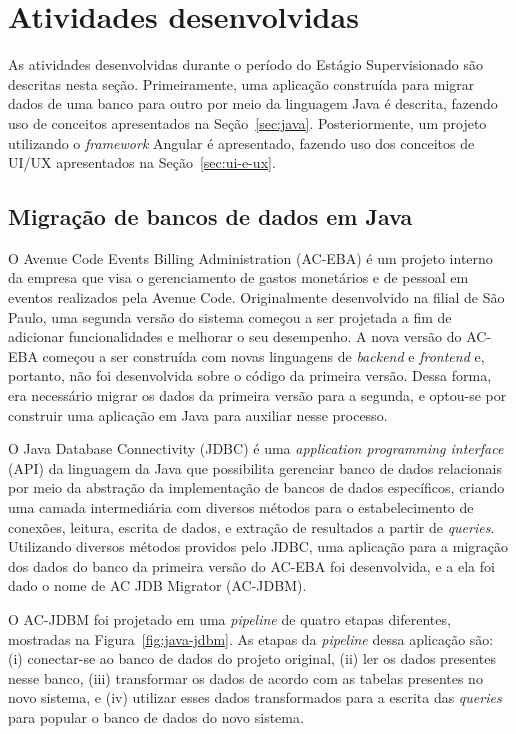 \chapter{Atividades desenvolvidas}
\label{cap:atividades-desenvolvidas}

As atividades desenvolvidas durante o período do Estágio Supervisionado são descritas nesta seção. Primeiramente, uma aplicação construída para migrar dados de uma banco para outro por meio da linguagem Java é descrita, fazendo uso de conceitos apresentados na Seção~\ref{sec:java}. Posteriormente, um projeto utilizando o \textit{framework} Angular é apresentado, fazendo uso dos conceitos de UI/UX apresentados na Seção~\ref{sec:ui-e-ux}.

\section{Migração de bancos de dados em Java}
\label{sec:java-atividades}

O Avenue Code Events Billing Administration (AC-EBA) é um projeto interno da empresa que visa o gerenciamento de gastos monetários e de pessoal em eventos realizados pela Avenue Code. Originalmente desenvolvido na filial de São Paulo, uma segunda versão do sistema começou a ser projetada a fim de adicionar funcionalidades e melhorar o seu desempenho. A nova versão do AC-EBA começou a ser construída com novas linguagens de \textit{backend} e \textit{frontend} e, portanto, não foi desenvolvida sobre o código da primeira versão. Dessa forma, era necessário migrar os dados da primeira versão para a segunda, e optou-se por construir uma aplicação em Java para auxiliar nesse processo.

O Java Database Connectivity (JDBC) é uma \textit{application programming interface} (API) da linguagem da Java que possibilita gerenciar banco de dados relacionais por meio da abstração da implementação de bancos de dados específicos, criando uma camada intermediária com diversos métodos para o estabelecimento de conexões, leitura, escrita de dados, e extração de resultados a partir de \textit{queries}. Utilizando diversos métodos providos pelo JDBC, uma aplicação para a migração dos dados do banco da primeira versão do AC-EBA foi desenvolvida, e a ela foi dado o nome de AC JDB Migrator (AC-JDBM).

O AC-JDBM foi projetado em uma \textit{pipeline} de quatro etapas diferentes, mostradas na Figura~\ref{fig:java-jdbm}. As etapas da \textit{pipeline} dessa aplicação são: (i) conectar-se ao banco de dados do projeto original, (ii) ler os dados presentes nesse banco, (iii) transformar os dados de acordo com as tabelas presentes no novo sistema, e (iv) utilizar esses dados transformados para a escrita das \textit{queries} para popular o banco de dados do novo sistema.

